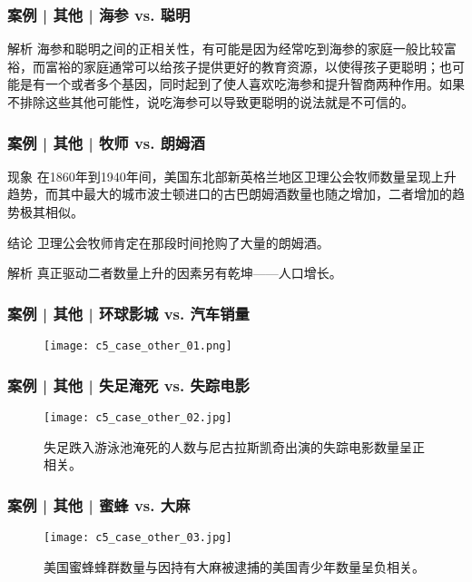 \begin{frame}
  \frametitle{案例 | 其他 | 海参 vs. 聪明}
  \begin{block}{解析}
海参和聪明之间的正相关性，有可能是因为经常吃到海参的家庭一般比较富裕，而富裕的家庭通常可以给孩子提供更好的教育资源，以使得孩子更聪明；也可能是有一个或者多个基因，同时起到了使人喜欢吃海参和提升智商两种作用。如果不排除这些其他可能性，说吃海参可以导致更聪明的说法就是不可信的。
  \end{block}
\end{frame}

\begin{frame}
  \frametitle{案例 | 其他 | 牧师 vs. 朗姆酒}
  \begin{block}{现象}
 在1860年到1940年间，美国东北部新英格兰地区卫理公会牧师数量呈现上升趋势，而其中最大的城市波士顿进口的古巴朗姆酒数量也随之增加，二者增加的趋势极其相似。
    \end{block}
  \pause
  \begin{block}{结论}
卫理公会牧师肯定在那段时间抢购了大量的朗姆酒。
  \end{block}
  \pause \pause \pause \pause
  \begin{block}{解析}
真正驱动二者数量上升的因素另有乾坤——人口增长。
  \end{block}
\end{frame}

\begin{frame}
  \frametitle{案例 | 其他 | 环球影城 vs. 汽车销量}
  \begin{figure}
    \centering
    \texttt{[image: c5\_case\_other\_01.png]}
  \end{figure}
\end{frame}

\begin{frame}
  \frametitle{案例 | 其他 | 失足淹死 vs. 失踪电影}
  \begin{figure}
    \centering
    \texttt{[image: c5\_case\_other\_02.jpg]}
    \caption{失足跌入游泳池淹死的人数与尼古拉斯凯奇出演的失踪电影数量呈正相关。}
  \end{figure}
\end{frame}

\begin{frame}
  \frametitle{案例 | 其他 | 蜜蜂 vs. 大麻}
  \begin{figure}
    \centering
    \texttt{[image: c5\_case\_other\_03.jpg]}
    \caption{美国蜜蜂蜂群数量与因持有大麻被逮捕的美国青少年数量呈负相关。}
  \end{figure}
\end{frame}

